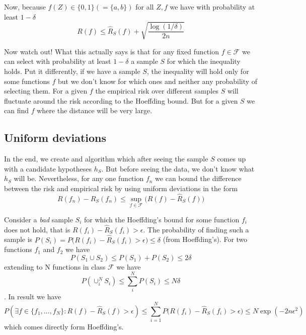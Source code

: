 Now, because $f(Z) \in \{0,1\} (=\{a,b\})$ for all $Z,f$ we have with probability at least $1-\delta$
\begin{equation}
R(f) \leq  \widehat{R}_S(f) + \sqrt{\frac{\log (1/ \delta)}{2n}}
\end{equation}

Now watch out! What this actually says is that for any fixed function $f \in \mathcal{F}$ we can select with probability at least $1-\delta$ a sample $S$ for which the inequality holds.
Put it differently, if we have a sample $S$, the inequality will hold only for some functions $f$ but we don't know for which ones and neither any probability of selecting them. For a given $f$ the empirical risk over different samples $S$ will fluctuate around the risk according to the Hoeffding bound. But for a given $S$ we can find $f$ where the distance will be very large.

\subsection{Uniform deviations}
In the end, we create and algorithm which after seeing the sample $S$ comes up with a candidate hypotheses $h_S$. 
But before seeing the data, we don't know what $h_S$ will be.
Nevertheless, for any one function $f_n$ we can bound the difference between the risk and empirical risk by using uniform deviations in the form
\begin{equation}
R(f_n) - \widehat{R}_S(f_n)  \leq \sup_{f \in \mathcal{F}} \big( R(f) - \widehat{R}_S(f) \big)
\end{equation}

Consider a \emph{bad} sample $S_i$ for which the Hoeffding's bound for some function $f_i$ does not hold, that is $R(f_i) - \widehat{R}_S(f_i) > \epsilon $. The probability of finding such a sample is $P(S_i) = P \big( R(f_i) - \widehat{R}_S(f_i) > \epsilon \big)  \leq \delta$ (from Hoeffding's).
For two functions $f_1$ and $f_2$ we have 
\begin{equation}
P(S_1 \cup S_2) \leq P(S_1) + P(S_2) \leq 2\delta
\end{equation}
extending to N functions in class $\mathcal{F}$ we have
\begin{equation}
P(\cup_i^N S_i) \leq \sum_i^N P(S_i) \leq N\delta
\end{equation}.
In result we have
\begin{equation}
P(\exists f \in \{f_1, \ldots, f_N \} : R(f) - \widehat{R}_S(f) > \epsilon) 
\leq \sum_{i=1}^N P \big( R(f_i) - \widehat{R}_S(f_i) > \epsilon \big)
 \leq N \exp(-2n\epsilon^2)
\end{equation}
which comes directly form Hoeffding's.

